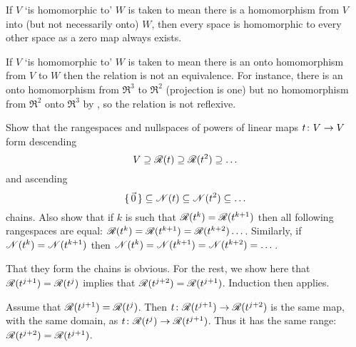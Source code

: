 \begin{exercises}
\begin{answer}
     If \( V \) `is homomorphic to' \( W \) is taken to mean there is a
     homomorphism from \( V \) into (but not necessarily onto) \( W \),
     then every space is homomorphic to every other space as a zero map always
     exists.

     If \( V \) `is homomorphic to' \( W \) is taken to mean there is an
     onto homomorphism from \( V \) to \( W \) then the relation is not
     an equivalence.
     For instance, there is an onto
     homomorphism from \( \Re^3 \) to \( \Re^2 \)
     (projection is one) but no homomorphism from \( \Re^2 \) onto
     \( \Re^3 \) by ,
     so the relation is not reflexive.  
   \end{answer}
  \item 
    Show that the rangespaces and nullspaces of powers of linear maps
    \( \mbox{$t\colon V\to V$} \) form descending
    \begin{equation*}
      V\supseteq \mathscr{R}(t)\supseteq\mathscr{R}(t^2)\supseteq\ldots
    \end{equation*}
    and ascending
    \begin{equation*}
     \mbox{$\{\,\vec{0}\,\}$}\subseteq\mathscr{N}(t)\subseteq\mathscr{N}(t^2)\subseteq\ldots
    \end{equation*}
    chains.
    Also show that if \( k \) is such that
    \( \mathscr{R}(t^k)=\mathscr{R}(t^{k+1}) \)
    then all following rangespaces are equal:
    \( \mathscr{R}(t^k)=\mathscr{R}(t^{k+1})=\mathscr{R}(t^{k+2})\ldots\, \).
    Similarly, if \( \mathscr{N}(t^k)=\mathscr{N}(t^{k+1}) \)
    then  
    \( \mathscr{N}(t^k)=\mathscr{N}(t^{k+1})=\mathscr{N}(t^{k+2})=\ldots\, \).
    \begin{answer}
      That they form the chains is obvious.
      For the rest, we show here that
      \( \mathscr{R}(t^{j+1})=\mathscr{R}(t^{j}) \)
      implies that
      \( \mathscr{R}(t^{j+2})=\mathscr{R}(t^{j+1}) \).
      Induction then applies.

      Assume that 
      \( \mathscr{R}(t^{j+1})=\mathscr{R}(t^{j}) \).
      Then \( \mbox{$t\colon \mathscr{R}(t^{j+1})\to \mathscr{R}(t^{j+2})$} \)
      is the same map, with the same domain, as
      \( \mbox{$t\colon \mathscr{R}(t^{j})\to \mathscr{R}(t^{j+1})$} \).
      Thus it has the same range:
      \( \mathscr{R}(t^{j+2})=\mathscr{R}(t^{j+1}) \).  
    \end{answer}
\end{exercises}
